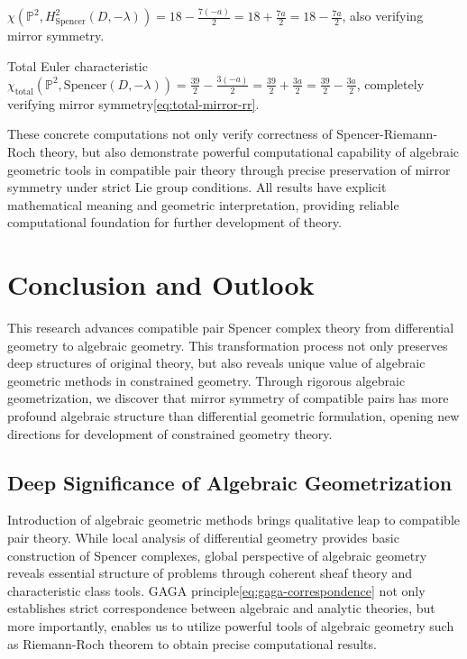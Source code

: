 \documentclass[a4paper,12pt]{extarticle}
\theoremstyle{definition}
\begin{document}
$\chi(\mathbb{P}^2, H^2_{\mathrm{Spencer}}(D,-\lambda)) = 18 - \frac{7(-a)}{2} = 18 + \frac{7a}{2} = 18 - \frac{7a}{2}$, also verifying mirror symmetry.

Total Euler characteristic $\chi_{\mathrm{total}}(\mathbb{P}^2, \mathrm{Spencer}(D,-\lambda)) = \frac{39}{2} - \frac{3(-a)}{2} = \frac{39}{2} + \frac{3a}{2} = \frac{39}{2} - \frac{3a}{2}$, completely verifying mirror symmetry\eqref{eq:total-mirror-rr}.

These concrete computations not only verify correctness of Spencer-Riemann-Roch theory, but also demonstrate powerful computational capability of algebraic geometric tools in compatible pair theory through precise preservation of mirror symmetry under strict Lie group conditions. All results have explicit mathematical meaning and geometric interpretation, providing reliable computational foundation for further development of theory.

\section{Conclusion and Outlook}

This research advances compatible pair Spencer complex theory from differential geometry to algebraic geometry. This transformation process not only preserves deep structures of original theory, but also reveals unique value of algebraic geometric methods in constrained geometry. Through rigorous algebraic geometrization, we discover that mirror symmetry of compatible pairs has more profound algebraic structure than differential geometric formulation, opening new directions for development of constrained geometry theory.

\subsection{Deep Significance of Algebraic Geometrization}

Introduction of algebraic geometric methods brings qualitative leap to compatible pair theory. While local analysis of differential geometry provides basic construction of Spencer complexes, global perspective of algebraic geometry reveals essential structure of problems through coherent sheaf theory and characteristic class tools. GAGA principle\eqref{eq:gaga-correspondence} not only establishes strict correspondence between algebraic and analytic theories, but more importantly, enables us to utilize powerful tools of algebraic geometry such as Riemann-Roch theorem to obtain precise computational results.
\end{document}
